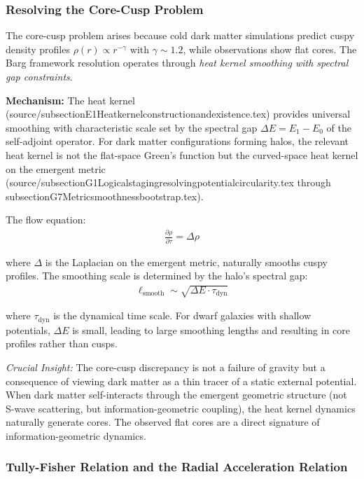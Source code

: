 \documentclass[12pt,a4paper]{article}
\begin{document}
\subsubsection{Resolving the Core-Cusp Problem}

The core-cusp problem arises because cold dark matter simulations predict cuspy density profiles $\rho(r) \propto r^{-\gamma}$ with $\gamma \sim 1.2$, while observations show flat cores. The Barg framework resolution operates through \textit{heat kernel smoothing with spectral gap constraints}.

\textbf{Mechanism:} The heat kernel (source/subsectionE1Heatkernelconstructionandexistence.tex) provides universal smoothing with characteristic scale set by the spectral gap $\Delta E = E_1 - E_0$ of the self-adjoint operator. For dark matter configurations forming halos, the relevant heat kernel is not the flat-space Green's function but the curved-space heat kernel on the emergent metric (source/subsectionG1Logicalstagingresolvingpotentialcircularity.tex through subsectionG7Metricsmoothnessbootstrap.tex).

The flow equation:
\begin{align}
\frac{\partial \rho}{\partial \tau} = \Delta \rho
\end{align}

where $\Delta$ is the Laplacian on the emergent metric, naturally smooths cuspy profiles. The smoothing scale is determined by the halo's spectral gap:
\begin{align}
\ell_{\text{smooth}} \sim \sqrt{\Delta E \cdot \tau_{\text{dyn}}}
\end{align}

where $\tau_{\text{dyn}}$ is the dynamical time scale. For dwarf galaxies with shallow potentials, $\Delta E$ is small, leading to large smoothing lengths and resulting in core profiles rather than cusps.

\textit{Crucial Insight:} The core-cusp discrepancy is not a failure of gravity but a consequence of viewing dark matter as a thin tracer of a static external potential. When dark matter self-interacts through the emergent geometric structure (not S-wave scattering, but information-geometric coupling), the heat kernel dynamics naturally generate cores. The observed flat cores are a direct signature of information-geometric dynamics.

\subsubsection{Tully-Fisher Relation and the Radial Acceleration Relation}
\end{document}
